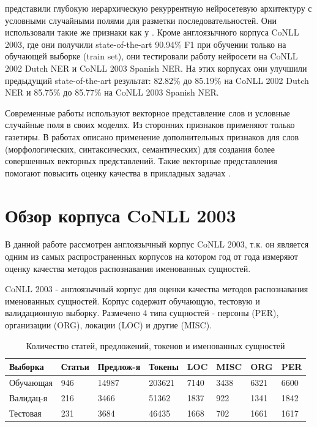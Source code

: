     \citep{DBLP:journals/corr/YangSC16} представили глубокую иерархическую рекуррентную нейросетевую
    архитектуру с условными случайными полями для разметки последовательностей.
    Они использовали такие же признаки как у \citep{collobert2011natural}.
    Кроме англоязычного корпуса CoNLL 2003, где они получили state-of-the-art 90.94\% F1 при обучении
    только на обучающей выборке (train set), они тестировали работу нейросети на CoNLL 2002 Dutch NER и CoNLL 2003 Spanish NER.
    На этих корпусах они улучшили предыдущий state-of-the-art результат:
    82.82\% до 85.19\% на CoNLL 2002 Dutch NER и 85.75\% до 85.77\% на CoNLL 2003 Spanish NER.

    Современные работы используют векторное представление слов
    и условные случайные поля в своих моделях. Из сторонних признаков применяют
    только газетиры. В работах \citep{xu2014rc, bian2014knowledge} описано применение дополнительных признаков для
    слов (морфологических, синтаксических, семантических) для создания более
    совершенных векторных представлений.
    Такие векторные представления помогают повысить оценку качества в
    прикладных задачах \citep{xu2014rc}.

  \section{Обзор корпуса CoNLL 2003}

  В данной работе рассмотрен англоязычный корпус CoNLL 2003, т.к. он является
  одним из самых распространенных корпусов на котором год от года измеряют оценку качества
  методов распознавания именованных сущностей.

  CoNLL 2003 \citep{tjong2003introduction} - англоязычный корпус для оценки качества
  методов распознавания именованных сущностей.
  Корпус содержит обучающую, тестовую и валидационную выборку.
  Размечено 4 типа сущностей - персоны (PER), организации (ORG), локации (LOC) и другие (MISC).
  \newpage
  \begin{table}[!h]
    \caption{Количество статей, предложений, токенов и именованных сущностей}
    \centering
    \begin{tabular}{ | p{2.9cm} | p{1.5cm} | p{2.5cm} | p{1.5cm} | p{1cm} | p{1.1cm} | p{1cm}| p{1cm} |}
      \hline\hline
      Выборка & Статьи & Предлож-я & Токены & LOC & MISC & ORG & PER \\
      \hline
      Обучающая & 946 & 14987 & 203621 & 7140 & 3438 & 6321 & 6600 \\
      \hline
      Валидац-я & 216 & 3466 & 51362 & 1837 & 922 & 1341 & 1842 \\
      \hline
      Тестовая & 231 & 3684 & 46435 & 1668 & 702 & 1661 & 1617 \\
      \hline
    \end{tabular}
  \end{table}

